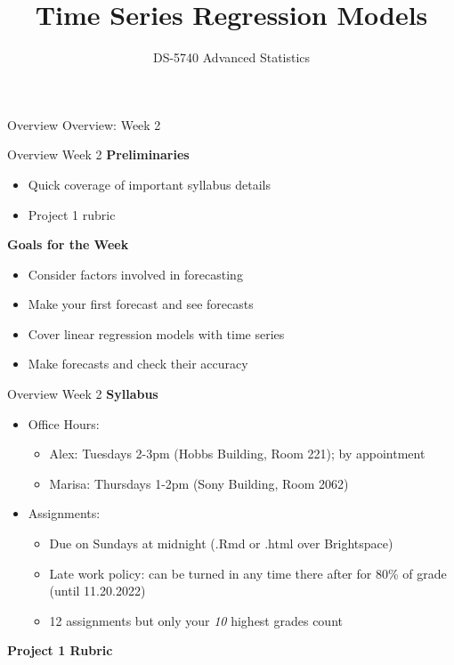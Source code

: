 \documentclass[
  ignorenonframetext,
]{beamer}
\title{Time Series Regression Models}
\author{DS-5740 Advanced Statistics}
\date{}
\providecommand{\tightlist}{%
  \setlength{\itemsep}{0pt}\setlength{\parskip}{0pt}}
\begin{document}
\frame{\titlepage}

\begin{frame}{Overview}
\protect\hypertarget{overview}{}
\center Overview: Week 2
\end{frame}

\begin{frame}{Overview \textbar{} \small Week 2}
\protect\hypertarget{overview-week-2}{}
\textbf{Preliminaries}

\begin{itemize}
\item
  Quick coverage of important syllabus details \newline
\item
  Project 1 rubric \newline
\end{itemize}

\textbf{Goals for the Week}

\begin{itemize}
\item
  Consider factors involved in forecasting \newline
\item
  Make your first forecast and see forecasts \newline
\item
  Cover linear regression models with time series \newline
\item
  Make forecasts and check their accuracy
\end{itemize}
\end{frame}

\begin{frame}{Overview \textbar{} \small Week 2}
\protect\hypertarget{overview-week-2-1}{}
\textbf{Syllabus}

\begin{itemize}
\item
  Office Hours:

  \begin{itemize}
  \tightlist
  \item
    Alex: Tuesdays 2-3pm (Hobbs Building, Room 221); by appointment
    \newline
  \item
    Marisa: Thursdays 1-2pm (Sony Building, Room 2062) \newline
  \end{itemize}
\item
  Assignments:

  \begin{itemize}
  \tightlist
  \item
    Due on Sundays at midnight (.Rmd or .html over Brightspace) \newline
  \item
    Late work policy: can be turned in any time there after for 80\% of
    grade (until 11.20.2022) \newline
  \item
    12 assignments but only your \textit{10} highest grades count
  \end{itemize}
\end{itemize}

\textbf{Project 1 Rubric}
\end{frame}
\end{document}

